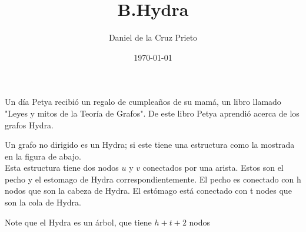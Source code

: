 \documentclass{article}
\begin{document}
    \title{B.Hydra} 
    \author{Daniel de la Cruz Prieto} 
    \date{\today} 
    \maketitle

    \begin{flushleft}
    	Un d\'ia Petya recibi\'o un regalo de cumplea\~nos de su mam\'a, un libro llamado "Leyes y mitos de la Teor\'ia de Grafos". De este libro Petya aprendi\'o acerca de los grafos Hydra.
    \end{flushleft}
    
    \begin{flushleft}
        Un grafo no dirigido es un Hydra; si este tiene una estructura como la mostrada en la figura de abajo.\\
        Esta estructura tiene dos nodos $u$ y $v$ conectados por una arista. Estos son el pecho y el estomago de Hydra
        correspondientemente. El pecho es conectado con h nodos que son la cabeza de Hydra. El est\'omago est\'a conectado con t nodes que son la cola de Hydra.
    \end{flushleft}
      
    \begin{flushleft}
         Note que el Hydra es un \'arbol, que tiene $h+t+2$ nodos
    \end{flushleft}
    
\end{document}

